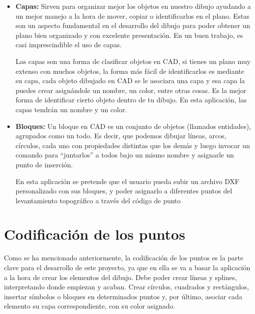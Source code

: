 \begin{itemize}

\item\textbf{Capas:} Sirven para organizar mejor los objetos en nuestro dibujo ayudando a un mejor manejo a la hora de mover, copiar o identificarlos en el plano. Estas son un aspecto fundamental en el desarrollo del dibujo para poder obtener un plano bien organizado y con excelente presentación. En un buen trabajo, es casi imprescindible el uso de capas.

Las capas son una forma de clasificar objetos en CAD, si tienes un plano muy extenso con muchos objetos, la forma más fácil de identificarlos es mediante su capa, cada objeto dibujado en CAD se le asociara una capa y esa capa la puedes crear asignándole un nombre, un color, entre otras cosas. Es la mejor forma de identificar cierto objeto dentro de tu dibujo.
En esta aplicación, las capas tendrán un nombre y un color.


\item\textbf{Bloques:} Un bloque en CAD es un conjunto de objetos (llamados entidades), agrupados como un todo. Es decir, que podemos dibujar líneas, arcos, círculos, cada uno con propiedades distintas que los demás y luego invocar un comando para “juntarlos” a todos bajo un mismo nombre y asignarle un punto de inserción.

En esta aplicación se pretende que el usuario pueda subir un archivo DXF personalizado con sus bloques, y poder asignarlo a diferentes puntos del levantamiento topográfico a través del código de punto

\end{itemize}

\section{Codificación de los puntos}

Como se ha mencionado anteriormente, la codificación de los puntos es la parte clave para el desarrollo de este proyecto, ya que en ella se va a basar la aplicación a la hora de crear los elementos del dibujo.
Debe poder crear líneas y splines, interpretando donde empiezan y acaban. Crear círculos, cuadrados y rectángulos, insertar símbolos o bloques en determinados puntos y, por último, asociar cada elemento su capa correspondiente, con su color asignado.

